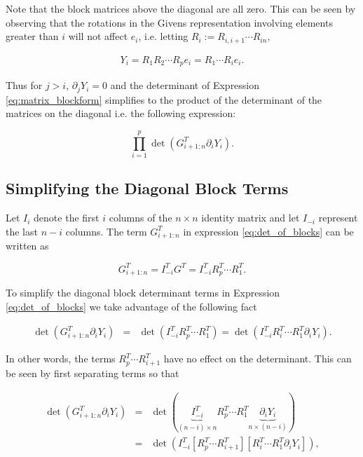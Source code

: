 \documentclass[ba]{imsart}
\numberwithin{equation}{section}
\theoremstyle{plain}
\begin{document}
\noindent Note that the block matrices above the diagonal are all zero.  This can be seen by observing that the rotations in the Givens representation involving elements greater than $i$ will not affect $e_i$, i.e. letting $R_i := R_{i,i+1} \cdots R_{in}$,

\begin{eqnarray}
Y_i = R_1 R_2 \cdots R_p e_i = R_1 \cdots R_i e_i.
\end{eqnarray}

\noindent Thus for $j > i$, $\partial_j Y_i = 0$ and the determinant of Expression \ref{eq:matrix_blockform} simplifies to the product of the determinant of the matrices on the diagonal i.e. the following expression:

\begin{equation}
\label{eq:det_of_blocks}
\prod_{i=1}^p \det \left( G_{i+1:n}^T \partial_{i} Y_i \right).
\end{equation}

\subsection{Simplifying the Diagonal Block Terms}
Let $I_{i}$ denote the first $i$ columns of the $n \times n$ identity matrix and let $I_{-i}$ represent the last $n-i$ columns. The term $G_{i+1:n}^T$ in expression \ref{eq:det_of_blocks} can be written as

\begin{equation}
G_{i+1:n}^T = I_{-i}^T G^T = I_{-i}^T R_p^T \cdots R_1^T.
\end{equation}

\noindent To simplify the diagonal block determinant terms in Expression \ref{eq:det_of_blocks} we take advantage of the following fact

\begin{eqnarray}
\det \left( G_{i+1:n}^T \partial_i Y_i  \right)  &=& \det \left( I_{-i}^T R_p^T \cdots R_1^T \right) =  \det\left( I_{-i}^T R_i^T \cdots R_1^T \partial_i Y_i \right).
\end{eqnarray}

\noindent In other words, the terms $R_p^T \cdots R_{i+1}^T$ have no effect on the determinant. This can be seen by first separating terms so that

\begin{eqnarray}
\det\left(G_{i+1:n}^T \partial_{i} Y_i \right) &=& \det\left( \underbrace{I_{-i}^T}_{(n-i) \times n} R_p^T \cdots R_1^T \underbrace{\partial_i Y_i}_{n \times (n-i)} \right)\\
&=& \det\left(
I_{-i}^T
\left[ R_p^T \cdots R_{i+1}^T\right] \left[ R_i^T \cdots R_1^T \partial_i Y_i \right] \right),
\end{eqnarray}
\end{document}
